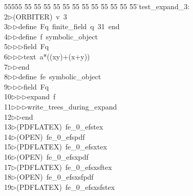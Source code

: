 %
%
\begin{tabbing}
55555 \= 55 \= 55 \= 55 \= 55 \= 55 \= 55 \= 55 \= 55 \= 55 \= 55 \= 55 \= 55 \= \>test\_expand\_3:\\[0pt]
2\>$\triangleright$\>(ORBITER)\ v\ 3\ \\[0pt]
3\>$\triangleright$\>$\triangleright$\>define\ Fq\ finite\_field\ q\ 31\ end\ \\[0pt]
4\>$\triangleright$\>$\triangleright$\>define\ f\ symbolic\_object\ \\[0pt]
5\>$\triangleright$\>$\triangleright$\>$\triangleright$\>field\ Fq\ \\[0pt]
6\>$\triangleright$\>$\triangleright$\>$\triangleright$\>text\ a*((xy)+(x+y))\ \\[0pt]
7\>$\triangleright$\>$\triangleright$\>end\ \\[0pt]
8\>$\triangleright$\>$\triangleright$\>define\ fe\ symbolic\_object\ \\[0pt]
9\>$\triangleright$\>$\triangleright$\>$\triangleright$\>field\ Fq\ \\[0pt]
10\>$\triangleright$\>$\triangleright$\>$\triangleright$\>expand\ f\ \\[0pt]
11\>$\triangleright$\>$\triangleright$\>$\triangleright$\>write\_trees\_during\_expand\ \\[0pt]
12\>$\triangleright$\>$\triangleright$\>end\\[0pt]
13\>$\triangleright$\>(PDFLATEX)\ fe\_0\_efstex\\[0pt]
14\>$\triangleright$\>(OPEN)\ fe\_0\_efspdf\\[0pt]
15\>$\triangleright$\>(PDFLATEX)\ fe\_0\_efsxtex\\[0pt]
16\>$\triangleright$\>(OPEN)\ fe\_0\_efsxpdf\\[0pt]
17\>$\triangleright$\>(PDFLATEX)\ fe\_0\_efsxsftex\\[0pt]
18\>$\triangleright$\>(OPEN)\ fe\_0\_efsxsfpdf\\[0pt]
19\>$\triangleright$\>(PDFLATEX)\ fe\_0\_efsxsfstex\\[0pt]

\end{tabbing}
